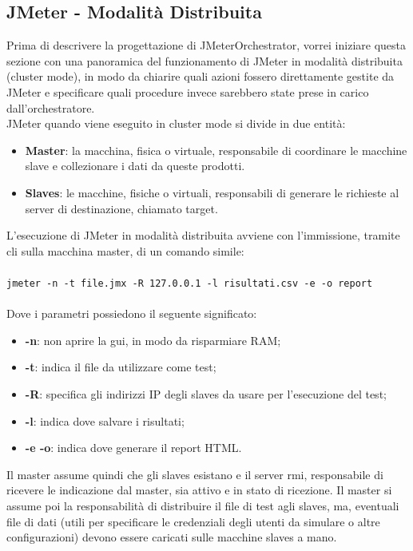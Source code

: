 \subsection{JMeter - Modalità Distribuita}
Prima di descrivere la progettazione di JMeterOrchestrator, vorrei iniziare questa sezione con una panoramica del funzionamento di JMeter in modalità distribuita (cluster mode), in modo da chiarire quali azioni fossero direttamente gestite da JMeter e specificare quali procedure invece sarebbero state prese in carico dall'orchestratore. \\
JMeter quando viene eseguito in cluster mode si divide in due entità:
\begin{itemize}
	\item \textbf{Master}: la macchina, fisica o virtuale, responsabile di coordinare le macchine slave e collezionare i dati da queste prodotti.
	\item \textbf{Slaves}: le macchine, fisiche o virtuali, responsabili di generare le richieste al server di destinazione, chiamato target.
\end{itemize}
L'esecuzione di JMeter in modalità distribuita avviene con l'immissione, tramite \gls{cli} sulla macchina master, di un comando simile:\\\\
\texttt{jmeter -n -t file.jmx -R 127.0.0.1 -l risultati.csv -e -o report}\\\\
Dove i parametri possiedono il seguente significato:
\begin{itemize}
	\item \textbf{-n}: non aprire la \gls{gui}, in modo da risparmiare RAM;
	\item \textbf{-t}: indica il file da utilizzare come test;
	\item \textbf{-R}: specifica gli indirizzi IP degli slaves da usare per l'esecuzione del test;
	\item \textbf{-l}: indica dove salvare i risultati;
	\item \textbf{-e -o}: indica dove generare il report HTML.
\end{itemize}
Il master assume quindi che gli slaves esistano e il server \gls{rmi}, responsabile di ricevere le indicazione dal master, sia attivo e in stato di ricezione. Il master si assume poi la responsabilità di distribuire il file di test agli slaves, ma, eventuali file di dati (utili per specificare le credenziali degli utenti da simulare o altre configurazioni) devono essere caricati sulle macchine slaves a mano.\\
